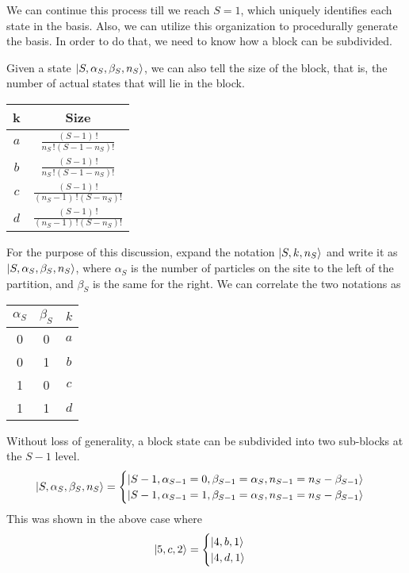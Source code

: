 	We can continue this process till we reach $ S = 1 $, which uniquely identifies each state in the basis. Also, we can utilize this organization to procedurally generate the basis. In order to do that, we need to know how a block can be subdivided. 
	
	Given a state $ \ket{S, \alpha_S, \beta_S, n_S} $, we can also tell the size of the block, that is, the number of actual states that will lie in the block.
	\begin{table}[h!]
		\centering
		\begin{tabular}{cc}
			\toprule
			k & Size \\
			\midrule
			$ a $ & $ \frac{(S-1)\,!}{n_S\,!(S - 1 -n_S)!} $ \vspace{3mm}\\
			$ b $ & $ \frac{(S-1)\,!}{n_S\,!(S - 1 -n_S)!} $ \vspace{3mm}\\
			$ c $ & $ \frac{(S-1)\,!}{(n_S - 1)\,!(S -n_S)!} $ \vspace{3mm}\\
			$ d $ & $ \frac{(S-1)\,!}{(n_S - 1)\,!(S -n_S)!} $\\
			\bottomrule
		\end{tabular}
	\end{table}
	
	For the purpose of this discussion, expand the notation $ \ket{S, k, n_S} $ and write it as $ \ket{S, \alpha_S, \beta_S, n_S} $, where $ \alpha_S $ is the number of particles on the site to the left of the partition, and $ \beta_S $ is the same for the right. We can correlate the two notations as
	\begin{table}[h!]
		\centering
		\begin{tabular}{ccc}
			\toprule
			$ \alpha_S $ & $ \beta_S $ & $ k $ \\
			\midrule
			0 & 0 & $ a $\\
			0 & 1 & $ b $\\
			1 & 0 & $ c $\\
			1 & 1 & $ d $\\
			\bottomrule
		\end{tabular}
	\end{table}
	
	Without loss of generality, a block state can be subdivided into two sub-blocks at the $ S-1 $ level.
	\begin{align*}
		\ket{S, \alpha_S, \beta_S, n_S} = 
		\begin{cases}
			\ket{S-1, \alpha_{S-1} = 0, \beta_{S-1} = \alpha_S, n_{S-1} = n_S - \beta_{S-1} }\\
			\ket{S-1, \alpha_{S-1} = 1, \beta_{S-1} = \alpha_S, n_{S-1} = n_S - \beta_{S-1} }\\
		\end{cases}
	\end{align*}
	This was shown in the above case where
	\begin{align*}
		\ket{5,c, 2} =
		\begin{cases}
			\ket{4,b, 1}\\
			\ket{4, d, 1}
		\end{cases}
	\end{align*}
	
